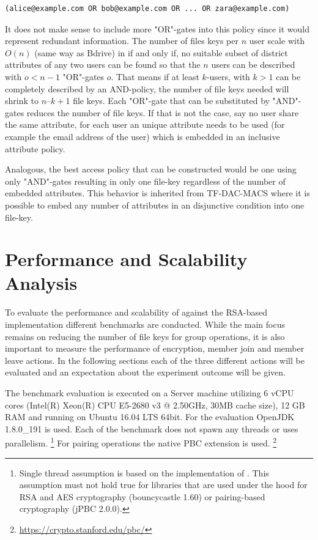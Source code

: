 \begin{center}
\begin{lstlisting}[caption={Worst case access policy. The used email address is a unique attribute per user.},captionpos=b]
(alice@example.com OR bob@example.com OR ... OR zara@example.com)
\end{lstlisting}
\end{center}

It does not make sense to include more "OR"-gates into this policy since it would represent redundant information. The number of files keys per $n$ user scale with $O(n)$ (same way as Bdrive) in \name if and only if, no suitable subset of district attributes of any two users can be found so that the $n$ users can be described with $o < n-1$ "OR"-gates $o$. 
That means if at least $k$-users, with $k > 1$  can be completely described by an AND-policy, the number of file keys needed will shrink to $n – k +1$ file keys. Each "OR"-gate that can be substituted by "AND"-gates reduces the number of file keys. 
If that is not the case, say no user share the same attribute, for each user an unique attribute needs to be used (for example the email address of the user) which is embedded in an inclusive attribute policy. 

Analogous, the best access policy that can be constructed would be one using only "AND"-gates resulting in only one file-key regardless of the number of embedded attributes. This behavior is inherited from  TF-DAC-MACS where it is possible to embed any number of attributes in an disjunctive condition into one file-key. 

\section{Performance and Scalability Analysis}

To evaluate the performance and scalability of \name against the RSA-based implementation different benchmarks are conducted. While the main focus remains on reducing the number of file keys for group operations, it is also important to measure the performance of encryption, member join and member leave actions. In the following sections each of the three different actions will be evaluated and an expectation about the experiment outcome will be given.

The benchmark evaluation is executed on a Server machine utilizing 6 vCPU cores (Intel(R) Xeon(R) CPU E5-2680 v3 @ 2.50GHz, 30MB cache size), 12 GB RAM and running on Ubuntu 16.04 LTS 64bit. For the evaluation OpenJDK 1.8.0\_191 is used. Each of the benchmark does not spawn any threads or uses parallelism. \footnote{Single thread assumption is based on the implementation of \name. This assumption must not hold true for libraries that are used under the hood for RSA and AES cryptography (bouncycastle 1.60) or pairing-based cryptography (jPBC 2.0.0).}  For pairing operations the native PBC extension is used. \footnote{\url{https://crypto.stanford.edu/pbc/}} 

